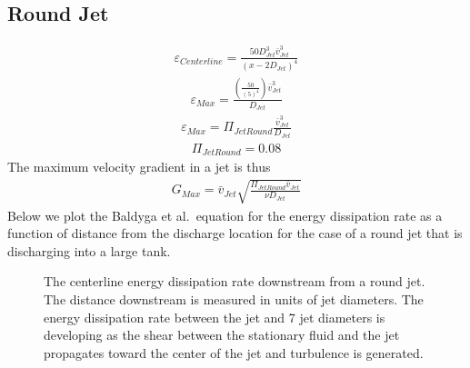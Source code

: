 \documentclass[letterpaper,10pt,english]{sphinxmanual}
\let\sphinxpxdimen\pdfpxdimen\else\newdimen\sphinxpxdimen
\begin{document}
\subsection{Round Jet}
\label{\detokenize{Rapid_Mix/RM_Derivations:round-jet}}\label{\detokenize{Rapid_Mix/RM_Derivations:heading-round-jet}}
\begin{equation}\label{equation:Rapid_Mix/RM_Derivations:Rapid_Mix/RM_Derivations:116}
\begin{split}\varepsilon_{Centerline} = \frac{50 D_{Jet}^3 \bar v_{Jet}^3}{ \left( x - 2 D_{Jet} \right)^4}\end{split}
\end{equation}\begin{equation}\label{equation:Rapid_Mix/RM_Derivations:Rapid_Mix/RM_Derivations:117}
\begin{split}\varepsilon_{Max} = \frac{\left( \frac{50}{\left( 5 \right)^4} \right) \bar v_{Jet}^3}{D_{Jet}}\end{split}
\end{equation}\begin{equation}\label{equation:Rapid_Mix/RM_Derivations:Rapid_Mix/RM_Derivations:118}
\begin{split}\varepsilon_{Max} = \Pi_{JetRound} \frac{\bar v_{Jet} ^3}{D_{Jet}}\end{split}
\end{equation}\begin{equation}\label{equation:Rapid_Mix/RM_Derivations:Rapid_Mix/RM_Derivations:119}
\begin{split}\Pi_{JetRound} = 0.08\end{split}
\end{equation}
The maximum velocity gradient in a jet is thus
\begin{equation}\label{equation:Rapid_Mix/RM_Derivations:Rapid_Mix/RM_Derivations:120}
\begin{split}G_{Max} = \bar v_{Jet} \sqrt{\frac{\Pi_{JetRound} \bar v_{Jet} }{\nu D_{Jet}}}\end{split}
\end{equation}
Below we plot the Baldyga et al. equation for the energy dissipation rate as a function of distance from the discharge location for the case of a round jet that is discharging into a large tank.

\begin{figure}[htbp]
\centering
\capstart

\noindent\sphinxincludegraphics[width=400\sphinxpxdimen]{{Jet_centerline_EDR}.png}
\caption{The centerline energy dissipation rate downstream from a round jet. The distance downstream is measured in units of jet diameters. The energy dissipation rate between the jet and 7 jet diameters is developing as the shear between the stationary fluid and the jet propagates toward the center of the jet and turbulence is generated.}\label{\detokenize{Rapid_Mix/RM_Derivations:id7}}\label{\detokenize{Rapid_Mix/RM_Derivations:figure-jet-centerline-edr}}\end{figure}
\end{document}
